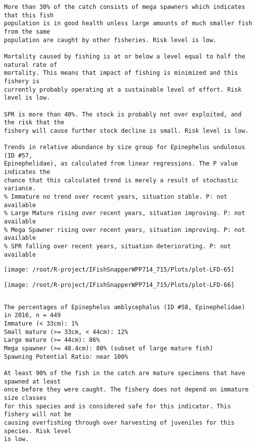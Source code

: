 \documentclass{report}\usepackage[]{graphicx}\usepackage[]{color}
\makeatletter
\def\maxwidth{ %
  \ifdim\Gin@nat@width>\linewidth
    \linewidth
  \else
    \Gin@nat@width
  \fi
}
\newenvironment{kframe}{%
 \def\at@end@of@kframe{}%
 \ifinner\ifhmode%
  \def\at@end@of@kframe{\end{minipage}}%
  \begin{minipage}{\columnwidth}%
 \fi\fi%
 \def\FrameCommand##1{\hskip\@totalleftmargin \hskip-\fboxsep
 \colorbox{shadecolor}{##1}\hskip-\fboxsep
     \hskip-\linewidth \hskip-\@totalleftmargin \hskip\columnwidth}%
 \MakeFramed {\advance\hsize-\width
   \@totalleftmargin\z@ \linewidth\hsize
   \@setminipage}}%
 {\par\unskip\endMakeFramed%
 \at@end@of@kframe}
\newenvironment{knitrout}{}{} %
\makeatother
\begin{document}
\begin{knitrout}
\begin{kframe}
\begin{verbatim}
More than 30% of the catch consists of mega spawners which indicates that this fish
population is in good health unless large amounts of much smaller fish from the same
population are caught by other fisheries. Risk level is low.
 
Mortality caused by fishing is at or below a level equal to half the natural rate of
mortality. This means that impact of fishing is minimized and this fishery is
currently probably operating at a sustainable level of effort. Risk level is low.
 
SPR is more than 40%. The stock is probably not over exploited, and the risk that the
fishery will cause further stock decline is small. Risk level is low.
 
Trends in relative abundance by size group for Epinephelus undulosus (ID #57,
Epinephelidae), as calculated from linear regressions. The P value indicates the
chance that this calculated trend is merely a result of stochastic variance.
% Immature no trend over recent years, situation stable. P: not available
% Large Mature rising over recent years, situation improving. P: not available
% Mega Spawner rising over recent years, situation improving. P: not available
% SPR falling over recent years, situation deteriorating. P: not available
\end{verbatim}
\end{kframe}
\texttt{[image: /root/R-project/IFishSnapperWPP714\_715/Plots/plot-LFD-65]} 

\texttt{[image: /root/R-project/IFishSnapperWPP714\_715/Plots/plot-LFD-66]} 
\begin{kframe}\begin{verbatim}
\end{verbatim}
\end{kframe}
\clearpage
\newpage
\begin{kframe}\begin{verbatim}The percentages of Epinephelus amblycephalus (ID #58, Epinephelidae) in 2016, n = 449
Immature (< 33cm): 1%
Small mature (>= 33cm, < 44cm): 12%
Large mature (>= 44cm): 86%
Mega spawner (>= 48.4cm): 80% (subset of large mature fish)
Spawning Potential Ratio: near 100%
 
At least 90% of the fish in the catch are mature specimens that have spawned at least
once before they were caught. The fishery does not depend on immature size classes
for this species and is considered safe for this indicator. This fishery will not be
causing overfishing through over harvesting of juveniles for this species. Risk level
is low.


\end{verbatim}
\end{kframe}
\end{knitrout}
\end{document}
